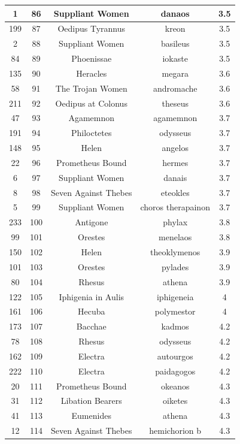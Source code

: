 \documentclass{jcls}
\begin{document}
\begin{longtable}{|c|c|c|c|c|}
  1 & 86 & Suppliant Women & danaos & 3.5 \\ \hline
  199 & 87 & Oedipus Tyrannus & kreon & 3.5 \\ \hline
  2 & 88 & Suppliant Women & basileus & 3.5 \\ \hline
  84 & 89 & Phoenissae & iokaste & 3.5 \\ \hline
  135 & 90 & Heracles & megara & 3.6 \\ \hline
  58 & 91 & The Trojan Women & andromache & 3.6 \\ \hline
  211 & 92 & Oedipus at Colonus & theseus & 3.6 \\ \hline
  47 & 93 & Agamemnon & agamemnon & 3.7 \\ \hline
  191 & 94 & Philoctetes & odysseus & 3.7 \\ \hline
  148 & 95 & Helen & angelos & 3.7 \\ \hline
  22 & 96 & Prometheus Bound & hermes & 3.7 \\ \hline
  6 & 97 & Suppliant Women & danais & 3.7 \\ \hline
  8 & 98 & Seven Against Thebes & eteokles & 3.7 \\ \hline
  5 & 99 & Suppliant Women & choros therapainon & 3.7 \\ \hline
  233 & 100 & Antigone & phylax & 3.8 \\ \hline
  99 & 101 & Orestes & menelaos & 3.8 \\ \hline
  150 & 102 & Helen & theoklymenos & 3.9 \\ \hline
  101 & 103 & Orestes & pylades & 3.9 \\ \hline
  80 & 104 & Rhesus & athena & 3.9 \\ \hline
  122 & 105 & Iphigenia in Aulis & iphigeneia & 4 \\ \hline
  161 & 106 & Hecuba & polymestor & 4 \\ \hline
  173 & 107 & Bacchae & kadmos & 4.2 \\ \hline
  78 & 108 & Rhesus & odysseus & 4.2 \\ \hline
  162 & 109 & Electra & autourgos & 4.2 \\ \hline
  222 & 110 & Electra & paidagogos & 4.2 \\ \hline
  20 & 111 & Prometheus Bound & okeanos & 4.3 \\ \hline
  31 & 112 & Libation Bearers & oiketes & 4.3 \\ \hline
  41 & 113 & Eumenides & athena & 4.3 \\ \hline
  12 & 114 & Seven Against Thebes & hemichorion b & 4.3 \\ \hline

\end{longtable}
\end{document}
